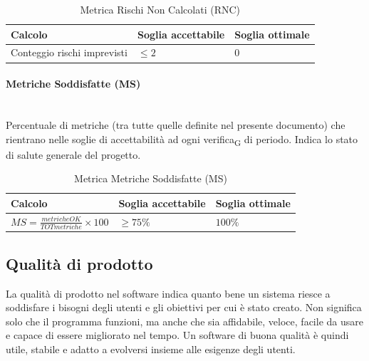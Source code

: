 \documentclass[11pt,a4paper]{article}
\newcommand{\gls}[1]{#1\textsubscript{G}}
\begin{document}
\begin{table}[H]
    \centering
    \renewcommand{\arraystretch}{1.5}
    \begin{tabular}{|M{0.4\textwidth}|M{0.25\textwidth}|M{0.25\textwidth}|}
        \hline
        \textbf{Calcolo} & \textbf{Soglia accettabile} & \textbf{Soglia ottimale} \\
        \hline
        Conteggio rischi imprevisti & $\le 2$ & $0$ \\
        \hline
    \end{tabular}
    \caption{Metrica Rischi Non Calcolati (RNC)}
\end{table}

\paragraph{Metriche Soddisfatte (MS)} \hfill \\
Percentuale di metriche (tra tutte quelle definite nel presente documento) che rientrano nelle soglie di accettabilità ad ogni \gls{verifica} di periodo. Indica lo stato di salute generale del progetto.

\begin{table}[H]
    \centering
    \renewcommand{\arraystretch}{1.5}
    \begin{tabular}{|M{0.4\textwidth}|M{0.25\textwidth}|M{0.25\textwidth}|}
        \hline
        \textbf{Calcolo} & \textbf{Soglia accettabile} & \textbf{Soglia ottimale} \\
        \hline
        $MS = \frac{metricheOK}{TOTmetriche} \times 100$ & $\ge 75\%$ & $100\%$ \\
        \hline
    \end{tabular}
    \caption{Metrica Metriche Soddisfatte (MS)}
\end{table}

\newpage

\subsection{Qualità di prodotto}
La qualità di prodotto nel software indica quanto bene un sistema riesce a soddisfare i bisogni degli utenti e gli obiettivi per cui è stato creato. Non significa solo che il programma funzioni, ma anche che sia affidabile, veloce, facile da usare e capace di essere migliorato nel tempo. Un software di buona qualità è quindi utile, stabile e adatto a evolversi insieme alle esigenze degli utenti.
\end{document}
